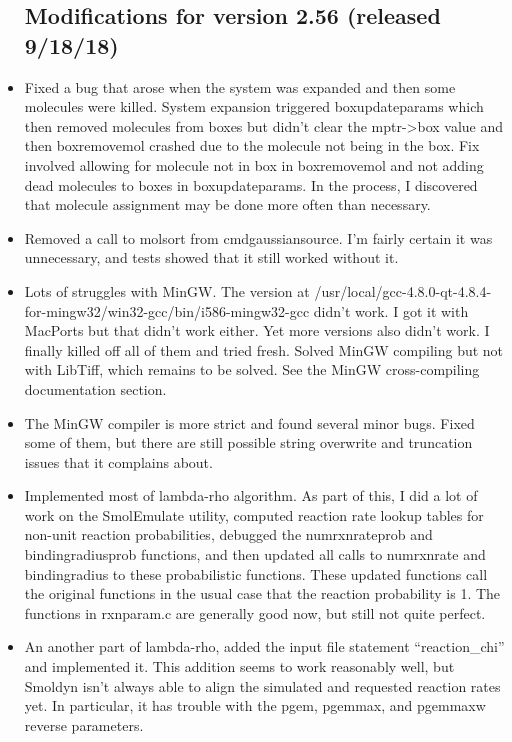 \documentclass {scrbook}
\begin{document}
\begin{itemize}
\subsection{Modifications for version 2.56 (released 9/18/18)}
\item Fixed a bug that arose when the system was expanded and then some molecules were killed. System expansion triggered boxupdateparams which then removed molecules from boxes but didn't clear the mptr->box value and then boxremovemol crashed due to the molecule not being in the box. Fix involved allowing for molecule not in box in boxremovemol and not adding dead molecules to boxes in boxupdateparams. In the process, I discovered that molecule assignment may be done more often than necessary.
\item Removed a call to molsort from cmdgaussiansource. I'm fairly certain it was unnecessary, and tests showed that it still worked without it.
\item Lots of struggles with MinGW. The version at /usr/local/gcc-4.8.0-qt-4.8.4-for-mingw32/win32-gcc/bin/i586-mingw32-gcc didn't work. I got it with MacPorts but that didn't work either. Yet more versions also didn't work. I finally killed off all of them and tried fresh. Solved MinGW compiling but not with LibTiff, which remains to be solved. See the MinGW cross-compiling documentation section.
\item The MinGW compiler is more strict and found several minor bugs. Fixed some of them, but there are still possible string overwrite and truncation issues that it complains about.
\item Implemented most of lambda-rho algorithm. As part of this, I did a lot of work on the SmolEmulate utility, computed reaction rate lookup tables for non-unit reaction probabilities, debugged the numrxnrateprob and bindingradiusprob functions, and then updated all calls to numrxnrate and bindingradius to these probabilistic functions. These updated functions call the original functions in the usual case that the reaction probability is 1. The functions in rxnparam.c are generally good now, but still not quite perfect.
\item An another part of lambda-rho, added the input file statement ``reaction\_chi'' and implemented it. This addition seems to work reasonably well, but Smoldyn isn't always able to align the simulated and requested reaction rates yet. In particular, it has trouble with the pgem, pgemmax, and pgemmaxw reverse parameters.


\end{itemize}
\end{document}
